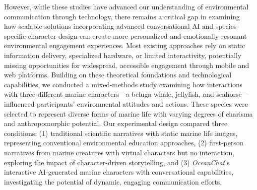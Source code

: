 \documentclass[sigconf, nonacm]{acmart}
\begin{document}
However, while these studies have advanced our understanding of environmental communication through technology, there remains a critical gap in examining how scalable solutions incorporating advanced conversational AI and species-specific character design can create more personalized and emotionally resonant environmental engagement experiences. Most existing approaches rely on static information delivery, specialized hardware, or limited interactivity, potentially missing opportunities for widespread, accessible engagement through mobile and web platforms. Building on these theoretical foundations and technological capabilities, we conducted a mixed-methods study examining how interactions with three different marine characters—a beluga whale, jellyfish, and seahorse—influenced participants' environmental attitudes and actions. These species were selected to represent diverse forms of marine life with varying degrees of charisma and anthropomorphic potential. Our experimental design compared three conditions: (1) traditional scientific narratives with static marine life images, representing conventional environmental education approaches, (2) first-person narratives from marine creatures with virtual characters but no interaction, exploring the impact of character-driven storytelling, and (3) \textit{OceanChat}'s interactive AI-generated marine characters with conversational capabilities, investigating the potential of dynamic, engaging communication efforts.
\end{document}
